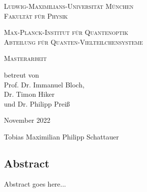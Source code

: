 \begin{titlepage}
    \vspace*{\fill}
    \centering

    \textsc{\Large Ludwig-Maximilians-Universität München}\\
    \textsc{Fakultät für Physik}

    \vspace{1cm}

    \textsc{\Large Max-Planck-Institut für Quantenoptik}\\
    \textsc{Abteilung für Quanten-Vielteilchensysteme}

    \vspace{2.3cm}

    \begin{doublespace}
        \textsc{ \Huge \titleDE}
    \end{doublespace}


    \vspace{2.3cm}
    \huge \textsc{Masterarbeit}



    \vspace{0.3cm}
    \large \textrm{betreut von\\Prof. Dr. Immanuel Bloch,\\Dr. Timon Hiker\\und Dr. Philipp Preiß}

    \vspace{1.5cm}
    \huge
    \textrm{November 2022}

    \vspace{1.5cm}
    \Large \textrm{Tobias Maximilian Philipp Schattauer}

    \vspace*{\fill}
\end{titlepage}

\begin{titlepage}
    \null\vspace{3cm}
    \section*{Abstract}
    Abstract goes here...
\end{titlepage}



\tableofcontents
\newpage